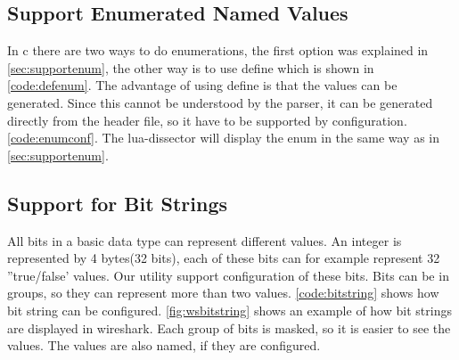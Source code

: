 \subsection{Support Enumerated Named Values}
In \Gls{c} there are two ways to do enumerations, the first option was explained in 
\autoref{sec:supportenum}, the other way is to use \gls{define} which is shown in 
\autoref{code:defenum}. The advantage of using \gls{define} is that the values 
can be generated. Since this cannot be understood by the \gls{parser}, it can be 
generated directly from the \gls{header} file, so it have to be supported by 
configuration. \autoref{code:enumconf}. The \Gls{lua}-\gls{dissector} will display the 
\gls{enum} in the same way as in \autoref{sec:supportenum}.





\subsection{Support for Bit Strings}
All bits in a basic data type can represent different values. An \gls{integer} is 
represented by 4 bytes(32 bits), each of these bits can for example represent 
32 ''true/false' values. Our \gls{utility} support configuration of these bits. Bits 
can be in groups, so they can represent more than two values. 
\autoref{code:bitstring} shows how \gls{bit string} can be configured. 
\autoref{fig:wsbitstring} shows an example of how \glspl{bit string} are displayed in 
\Gls{wireshark}. Each group of bits is masked, so it is easier to see the values. 
The values are also named, if they are configured.

